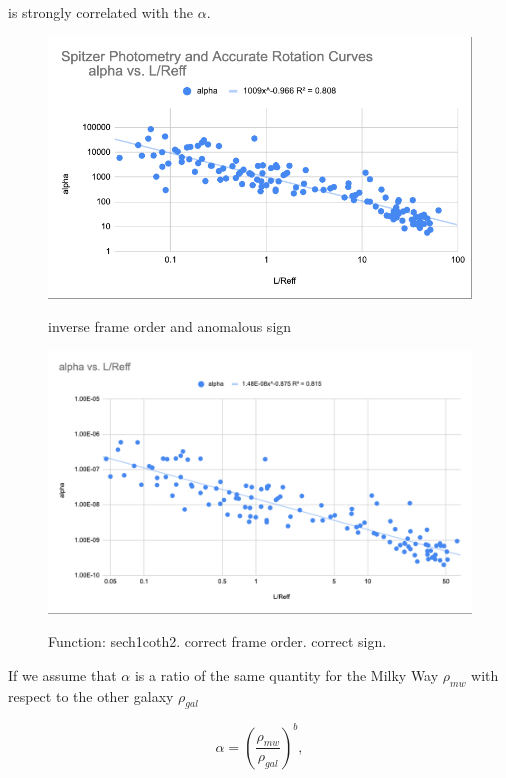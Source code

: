 \documentclass[reprint,%
 amsmath,amssymb,
 aps,
]{revtex4-1}
\begin{document}
   is   strongly correlated with the $\alpha$. 
  
 \begin{figure}[h]
\scalebox{0.5}%
{\includegraphics{alpha_9_29_21_minus3.png} }
\caption{ inverse frame order and   anomalous sign }
\label{alpha2}
\end{figure}  

 \begin{figure}[h]
\scalebox{0.5}%
{\includegraphics{sech1Coth2.png} }
\caption{   Function: sech1coth2. correct frame order. correct sign. }
\label{alpha3}
\end{figure} 


If we assume that $\alpha$ is a ratio of the same quantity for  the Milky Way $\rho_{mw}$ with respect to the other   galaxy $\rho_{gal}$  

\begin{equation}
\alpha=\left(\frac{\rho_{mw}}{\rho_{gal}}\right)^{b}  ,
\label{correl}
\end{equation}
\end{document}
